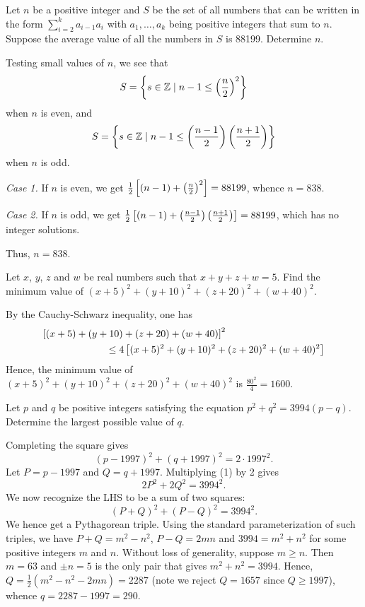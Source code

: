 \begin{question}[838]\label{A::2020-O-1-23}
    Let $n$ be a positive integer and $S$ be the set of all numbers that can be written in the form $\displaystyle\sum_{i = 2}^k a_{i-1}a_i$ with $a_1, \ldots, a_k$ being positive integers that sum to $n$. Suppose the average value of all the numbers in $S$ is 88199. Determine $n$.
\end{question}

Testing small values of $n$, we see that \[S = \left\lbrace s \in \mathbb{Z} \mid n-1 \leq \left( \frac{n}{2} \right)^2 \right\rbrace\] when $n$ is even, and \[S = \left\lbrace s \in \mathbb{Z} \mid n-1 \leq \left( \frac{n-1}{2} \right)\left( \frac{n+1}{2} \right) \right\rbrace\] when $n$ is odd.

\textit{Case 1.} If $n$ is even, we get $\frac12 \left[ (n-1) + \left( \frac{n}{2} \right)^2 \right] = 88199$, whence $n = 838$.

\textit{Case 2.} If $n$ is odd, we get $\frac12 \left[ (n-1) + \left( \frac{n-1}{2} \right)\left( \frac{n+1}{2} \right) \right] = 88199$, which has no integer solutions.

Thus, $n = 838$.

\begin{question}[1600]\label{A::2020-O-1-24}
    Let $x$, $y$, $z$ and $w$ be real numbers such that $x + y + z + w = 5$. Find the minimum value of $(x + 5)^2 + (y + 10)^2 + (z + 20)^2 + (w + 40)^2$.
\end{question}

By the Cauchy-Schwarz inequality, one has
\begin{align*}
    \bs{(x+5)+(y+10)+(z+20)+(w+40)}^2 \hspace{10em}\\
    \hspace{3em}\leq 4 \bs{(x + 5)^2 + (y + 10)^2 + (z + 20)^2 + (w + 40)^2}
\end{align*}
Hence, the minimum value of $(x + 5)^2 + (y + 10)^2 + (z + 20)^2 + (w + 40)^2$ is $\frac{80^2}4 = 1600$.

\begin{question}[290]\label{A::2020-O-1-25}
    Let $p$ and $q$ be positive integers satisfying the equation $p^2 + q^2 = 3994(p-q)$. Determine the largest possible value of $q$.
\end{question}

Completing the square gives \[(p-1997)^2 + (q+1997)^2 = 2 \cdot 1997^2. \tag{1}\] Let $P = p - 1997$ and $Q = q + 1997$. Multiplying (1) by 2 gives \[2P^2 + 2Q^2 = 3994^2.\] We now recognize the LHS to be a sum of two squares: \[(P+Q)^2 + (P-Q)^2 = 3994^2.\] We hence get a Pythagorean triple. Using the standard parameterization of such triples, we have $P+Q = m^2 - n^2$, $P-Q = 2mn$ and $3994 = m^2 + n^2$ for some positive integers $m$ and $n$. Without loss of generality, suppose $m \geq n$. Then $m = 63$ and $\pm n = 5$ is the only pair that gives $m^2 + n^2 = 3994$. Hence, $Q = \frac12 (m^2 - n^2 - 2mn) = 2287$ (note we reject $Q = 1657$ since $Q \geq 1997$), whence $q = 2287 - 1997 = 290$.